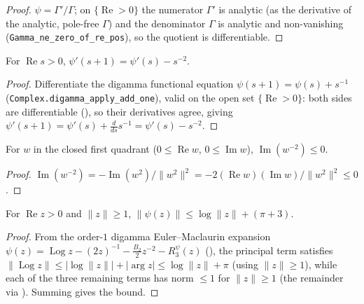 \begin{proof}
\leanok
$\psi=\Gamma'/\Gamma$; on $\{\operatorname{Re}>0\}$ the numerator $\Gamma'$ is analytic
(as the derivative of the analytic, pole-free $\Gamma$) and the denominator $\Gamma$ is
analytic and non-vanishing (\texttt{Gamma\_ne\_zero\_of\_re\_pos}), so the quotient is
differentiable.
\end{proof}

\begin{lemma}
\label{lem:ga_trigamma_rec}
\leanok
{}
For $\operatorname{Re}s>0$, $\psi'(s+1)=\psi'(s)-s^{-2}$.
\end{lemma}

\begin{proof}
\leanok
{}
Differentiate the digamma functional equation $\psi(s+1)=\psi(s)+s^{-1}$
(\texttt{Complex.digamma\_apply\_add\_one}), valid on the open set $\{\operatorname{Re}>0\}$:
both sides are differentiable (), so their derivatives agree,
giving $\psi'(s+1)=\psi'(s)+\tfrac{d}{ds}s^{-1}=\psi'(s)-s^{-2}$.
\end{proof}

\begin{lemma}
\label{lem:ga_im_inv_sq}
\leanok
For $w$ in the closed first quadrant ($0\le\operatorname{Re}w$, $0\le\operatorname{Im}w$),
$\operatorname{Im}(w^{-2})\le0$.
\end{lemma}

\begin{proof}
\leanok
$\operatorname{Im}(w^{-2})=-\operatorname{Im}(w^2)/\lVert w^2\rVert^2
=-2(\operatorname{Re}w)(\operatorname{Im}w)/\lVert w^2\rVert^2\le0$.
\end{proof}

\begin{lemma}
\label{lem:ga_digamma_bound}
\leanok
{}
For $\operatorname{Re}z>0$ and $\lVert z\rVert\ge1$,
$\lVert\psi(z)\rVert\le\log\lVert z\rVert+(\pi+3)$.
\end{lemma}

\begin{proof}
\leanok
{}
From the order-$1$ digamma Euler--Maclaurin expansion
$\psi(z)=\operatorname{Log}z-(2z)^{-1}-\tfrac{B_2}{2}z^{-2}-R^{\psi}_3(z)$
(), the principal term satisfies
$\lVert\operatorname{Log}z\rVert\le\lvert\log\lVert z\rVert\rvert+\lvert\arg z\rvert
\le\log\lVert z\rVert+\pi$ (using $\lVert z\rVert\ge1$), while each of the three remaining
terms has norm $\le1$ for $\lVert z\rVert\ge1$ (the remainder via
). Summing gives the bound.
\end{proof}

